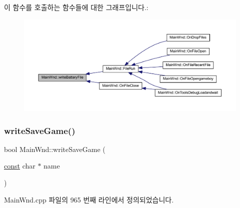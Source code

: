 이 함수를 호출하는 함수들에 대한 그래프입니다.\+:
\nopagebreak
\begin{figure}[H]
\begin{center}
\leavevmode
\includegraphics[width=350pt]{class_main_wnd_a653d11c15657ad15c35073eaf892519c_icgraph}
\end{center}
\end{figure}
\mbox{\label{class_main_wnd_a2ce340f4f9cfbb4ec41be6ce2e33ed23}} 
\subsubsection{\texorpdfstring{write\+Save\+Game()}{writeSaveGame()}}
{\footnotesize\ttfamily bool Main\+Wnd\+::write\+Save\+Game (\begin{DoxyParamCaption}\item[{\mbox{\hyperlink{getopt1_8c_a2c212835823e3c54a8ab6d95c652660e}{const}} char $\ast$}]{name }\end{DoxyParamCaption})}



Main\+Wnd.\+cpp 파일의 965 번째 라인에서 정의되었습니다.


